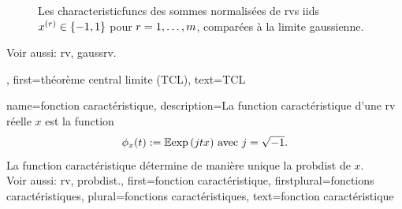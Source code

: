 {{\begin{figure}[H]
			\caption{Les \glspl{characteristicfunc} des sommes normalisées de \glspl{rv} \glspl{iid} $x^{(r)} \in \{-1,1\}$ 
				pour $r=1,\ldots,m$, comparées à la limite gaussienne.}
		\end{figure}
		Voir aussi: \gls{rv}, \gls{gaussrv}.},
	first={théorème central limite (TCL)},
	text={TCL}
}

{name={fonction caractéristique},
	description={La \gls{function} caractéristique 
		d’une \gls{rv} réelle $x$ est la \gls{function} \cite[Sec.~26]{BillingsleyProbMeasure}
		$$ \phi_{x}(t) := \mathbb{E} { \exp\,(j t x) } \mbox{ avec } j = \sqrt{-1}. $$
		La \gls{function} caractéristique détermine de manière unique la \gls{probdist} de $x$. 
		\\
		Voir aussi: \gls{rv}, \gls{probdist}.},
	first={fonction caractéristique},
	firstplural={fonctions caractéristiques}, 
	plural={fonctions caractéristiques},
	text={fonction caractéristique}
}

